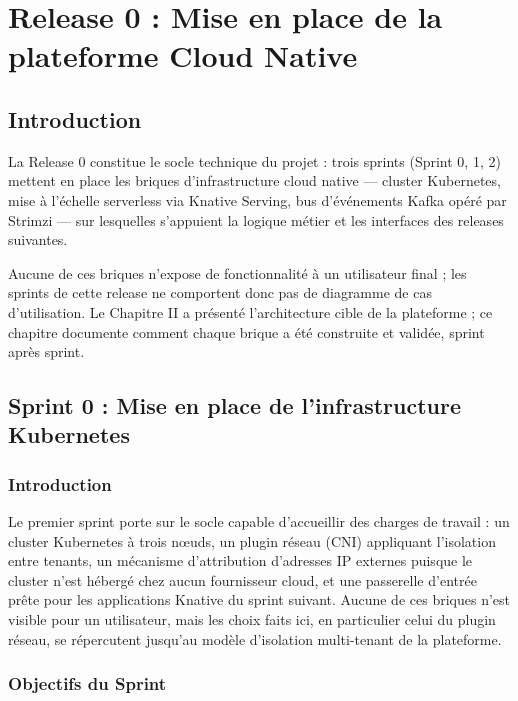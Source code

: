 \chapter{Release 0 : Mise en place de la plateforme Cloud Native}

\section{Introduction}

La Release 0 constitue le socle technique du projet : trois sprints (Sprint 0, 1, 2) mettent en place les briques d'infrastructure cloud native — cluster Kubernetes, mise à l'échelle serverless via Knative Serving, bus d'événements Kafka opéré par Strimzi — sur lesquelles s'appuient la logique métier et les interfaces des releases suivantes.

Aucune de ces briques n'expose de fonctionnalité à un utilisateur final ; les sprints de cette release ne comportent donc pas de diagramme de cas d'utilisation. Le Chapitre II a présenté l'architecture cible de la plateforme ; ce chapitre documente comment chaque brique a été construite et validée, sprint après sprint.


\section{Sprint 0 : Mise en place de l'infrastructure Kubernetes}

\subsection{Introduction}

Le premier sprint porte sur le socle capable d'accueillir des charges de travail : un cluster Kubernetes à trois nœuds, un plugin réseau (CNI) appliquant l'isolation entre tenants, un mécanisme d'attribution d'adresses IP externes puisque le cluster n'est hébergé chez aucun fournisseur cloud, et une passerelle d'entrée prête pour les applications Knative du sprint suivant. Aucune de ces briques n'est visible pour un utilisateur, mais les choix faits ici, en particulier celui du plugin réseau, se répercutent jusqu'au modèle d'isolation multi-tenant de la plateforme.

\subsection{Objectifs du Sprint}

